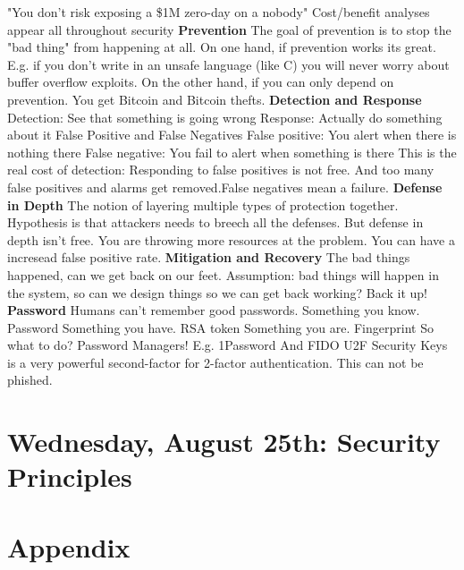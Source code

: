 \documentclass[11 pt]{scrartcl}
\begin{document}
    \ii "You don't risk exposing a \$1M zero-day on a nobody"
    \ii Cost/benefit analyses appear all throughout security
\itemend
\textbf{Prevention}\newline
The goal of prevention is to stop the "bad thing" from happening at all. On one hand, if prevention works its great. E.g. if you don't write in an unsafe language (like C) you will never worry about buffer overflow exploits. On the other hand, if you can only depend on prevention. You get Bitcoin and Bitcoin thefts.\newline
\textbf{Detection and Response}\newline
Detection: See that something is going wrong\newline
Response: Actually do something about it\newline
False Positive and False Negatives\newline
False positive: You alert when there is nothing there \newline
False negative: You fail to alert when something is there \newline
This is the real cost of detection:\newline
Responding to false positives is not free. And too many false positives and alarms get removed.False negatives mean a failure.\newline
\textbf{Defense in Depth}\newline
The notion of layering multiple types of protection together. Hypothesis is that attackers needs to breech all the defenses. But defense in depth isn't free. You are throwing more resources at the problem. You can have a incresead false positive rate.\newline
\textbf{Mitigation and Recovery}
The bad things happened, can we get back on our feet. Assumption: bad things will happen in the system, so can we design things so we can get back working? Back it up!\newline
\textbf{Password}\newline
Humans can't remember good passwords.\newline
Something you know. Password\newline
Something you have. RSA token\newline
Something you are. Fingerprint\newline
So what to do? Password Managers! E.g. 1Password\newline
And FIDO U2F Security Keys is a very powerful second-factor for 2-factor authentication. This can not be phished.
\newpage
\section{Wednesday, August 25th: Security Principles}



\section{Appendix}
\renewcommand{\listtheoremname}{List of Definitions and Theorems}
\listoftheorems[ignoreall,show={theorem,definition}]

\listoftodos
\end{document}
